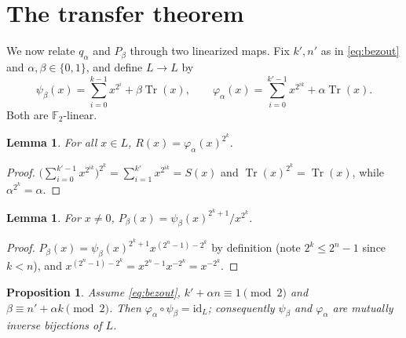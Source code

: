 \documentclass[11pt,a4paper]{article}
\newtheorem{proposition}[theorem]{Proposition}
\newtheorem{lemma}[theorem]{Lemma}
\theoremstyle{definition}
\newcommand{\F}{\mathbb{F}}
\newcommand{\Tr}{\operatorname{Tr}}
\newcommand{\rhs}{R}
\begin{document}
\section{The transfer theorem}\label{sec:transfer}

We now relate $q_\alpha$ and $P_\beta$ through two linearized maps.  Fix
$k',n'$ as in \eqref{eq:bezout} and $\alpha,\beta\in\{0,1\}$, and define
$L\to L$ by
\[
  \psi_\beta(x)=\sum_{i=0}^{k-1}x^{2^{i}}+\beta\Tr(x),
  \qquad
  \varphi_\alpha(x)=\sum_{i=0}^{k'-1}x^{2^{ik}}+\alpha\Tr(x) .
\]
Both are $\F_2$-linear.

\begin{lemma}\label{lem:Rphi}
For all $x\in L$, $\rhs(x)=\varphi_\alpha(x)^{2^{k}}$.
\end{lemma}

\begin{proof}
$\bigl(\sum_{i=0}^{k'-1}x^{2^{ik}}\bigr)^{2^{k}}=\sum_{i=1}^{k'}x^{2^{ik}}=S(x)$
and $\Tr(x)^{2^{k}}=\Tr(x)$, while $\alpha^{2^{k}}=\alpha$.
\end{proof}

\begin{lemma}\label{lem:Pdiv}
For $x\neq0$, $P_\beta(x)=\psi_\beta(x)^{2^{k}+1}\big/x^{2^{k}}$.
\end{lemma}

\begin{proof}
$P_\beta(x)=\psi_\beta(x)^{2^{k}+1}x^{(2^{n}-1)-2^{k}}$ by definition (note
$2^{k}\le 2^{n}-1$ since $k<n$), and $x^{(2^{n}-1)-2^{k}}=x^{2^{n}-1}x^{-2^{k}}
=x^{-2^{k}}$.
\end{proof}

\begin{proposition}\label{prop:transferinv}
Assume \eqref{eq:bezout}, $k'+\alpha n\equiv 1\pmod2$ and
$\beta\equiv n'+\alpha k\pmod 2$.  Then $\varphi_\alpha\circ\psi_\beta=\mathrm{id}_L$;
consequently $\psi_\beta$ and $\varphi_\alpha$ are mutually inverse bijections of $L$.
\end{proposition}
\end{document}
